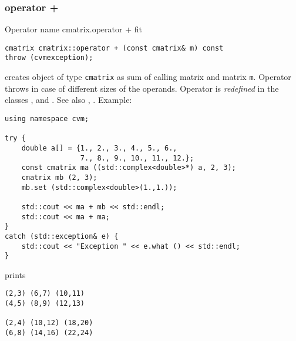 \subsubsection{operator +}
Operator%
\pdfdest name {cmatrix.operator +} fit
\begin{verbatim}
cmatrix cmatrix::operator + (const cmatrix& m) const
throw (cvmexception);
\end{verbatim}
creates  object of type \verb"cmatrix" as  sum of
 calling matrix and  matrix \verb"m".
Operator throws  
in case of different sizes of the operands.
Operator is \emph{redefined} in the classes
,  
and .
See also , .
Example:
\begin{Verbatim}
using namespace cvm;

try {
    double a[] = {1., 2., 3., 4., 5., 6.,
                  7., 8., 9., 10., 11., 12.};
    const cmatrix ma ((std::complex<double>*) a, 2, 3);
    cmatrix mb (2, 3);
    mb.set (std::complex<double>(1.,1.));

    std::cout << ma + mb << std::endl;
    std::cout << ma + ma;
}
catch (std::exception& e) {
    std::cout << "Exception " << e.what () << std::endl;
}
\end{Verbatim}
prints
\begin{Verbatim}
(2,3) (6,7) (10,11)
(4,5) (8,9) (12,13)

(2,4) (10,12) (18,20)
(6,8) (14,16) (22,24)
\end{Verbatim}
\newpage



